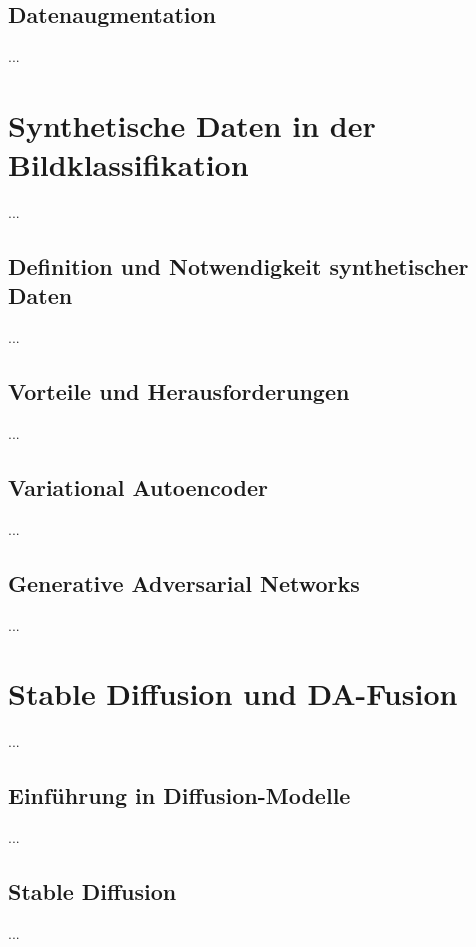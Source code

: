 \subsection{Datenaugmentation}

...

\section{Synthetische Daten in der Bildklassifikation}

...

\subsection{Definition und Notwendigkeit synthetischer Daten}

...

\subsection{Vorteile und Herausforderungen}

...

\subsection{Variational Autoencoder}

...

\subsection{Generative Adversarial Networks}

...

\section{Stable Diffusion und DA-Fusion}

...

\subsection{Einführung in Diffusion-Modelle}

...

\subsection{Stable Diffusion}

...

